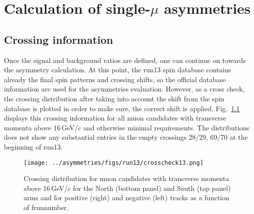 

\chapter{Calculation of single-$\mu$ asymmetries}
\label{ch:asymmetries}

\section{Crossing information}
Once the signal and background ratios are defined, one can continue on towards the asymmetry calculation. 
At this point, the run13 spin database contains already the final spin patterns and crossing shifts, 
so the official database information are used for the asymmetries evaluation. However, as a cross check, the crossing distribution after taking into 
account the shift from the spin database is plotted in order to make sure, the correct shift is applied. Fig.~\ref{fig:crossingdist} 
displays this crossing information for all muon candidates with transverse momenta above 16\,GeV/$c$ and otherwise minimal requirements.
 The distributions does not show any substantial entries in the empty  crossings 28/29, 69/70 at the beginning of run13.

\begin{figure}[ht]
\begin{center}
\texttt{[image: ../asymmetries/figs/run13/crosscheck13.png]}
\caption{Crossing distribution for muon candidates with transverse momenta above 16\,GeV/$c$ for the North (bottom panel) and South (top panel) arms and for positive (right) and negative (left) tracks as a function of frunnumber. \label{fig:crossingdist}}
\end{center}
\end{figure}

